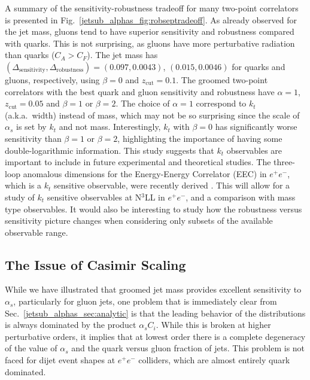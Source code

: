 \documentclass[11pt]{cernrep}
\begin{document}
A summary of the sensitivity-robustness tradeoff for many two-point correlators is presented in Fig.~\ref{jetsub_alphas_fig:robseptradeoff}.  As already observed for the jet mass, gluons tend to have superior sensitivity and robustness compared with quarks.
%
This is not surprising, as gluons have more perturbative radiation than quarks ($C_A>C_F$).
%
The jet mass has $(\Delta_\mathrm{sensitivity},\Delta_\mathrm{robustness})=(0.097,0.0043)$, $(0.015,0.0046)$ for quarks and gluons, respectively, using $\beta=0$ and $z_\mathrm{cut}=0.1$.
%
The groomed two-point correlators with the best quark and gluon sensitivity and robustness have $\alpha=1$, $z_\mathrm{cut}=0.05$ and $\beta=1$ or $\beta=2$.
%
The choice of $\alpha=1$ correspond to $k_t$ (a.k.a.~width) instead of mass, which may not be so surprising since the scale of $\alpha_s$ is set by $k_t$ and not mass.
%
Interestingly, $k_t$ with $\beta=0$ has significantly worse sensitivity than $\beta=1$ or $\beta=2$, highlighting the importance of having some double-logarithmic information. 
%
This study suggests that $k_t$ observables are important to include in future experimental and theoretical studies. The three-loop anomalous dimensions for the Energy-Energy Correlator (EEC) in $e^+e^-$, which is a $k_t$ sensitive observable, were recently derived \cite{Moult:2018jzp}. This will allow for a study of $k_t$ sensitive observables at N$^3$LL in $e^+e^-$, and a comparison with mass type observables. 
%
It would also be interesting to study how the robustness versus sensitivity picture changes when considering only subsets of the available observable range.

\subsection{The Issue of Casimir Scaling}
\label{jetsub_alphas_sec:casimir}

While we have illustrated that groomed jet mass provides excellent sensitivity to $\alpha_s$, particularly for gluon jets, one problem that is immediately clear from Sec.~\ref{jetsub_alphas_sec:analytic} is that the leading behavior of the distributions is always dominated by the product $\alpha_s C_i$.
%
While this is broken at higher perturbative orders, it implies that at lowest order there is a complete degeneracy of the value of $\alpha_s$ and the quark versus gluon fraction of jets.
%
This problem is not faced for dijet event shapes at $e^+e^-$ colliders, which are almost entirely quark dominated.
\end{document}
